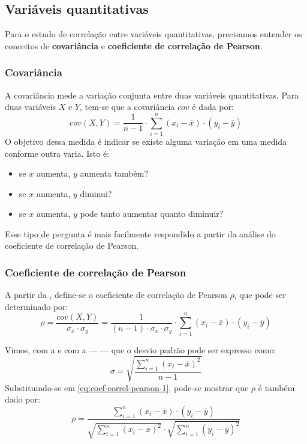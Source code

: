 \subsection{Variáveis quantitativas}%

Para o estudo de correlação entre variáveis quantitativas, precisamos entender
os conceitos de \textbf{covariância} e \textbf{coeficiente de correlação de
Pearson}.

\subsubsection{Covariância}

A covariância mede a variação conjunta entre duas variáveis quantitativas. Para
duas variáveis $X$ e $Y$, tem-se que a covariância $cov$ é dada por:
\begin{equation}
    cov(X,Y) = \frac{1}{n-1} \cdot \sum_{i=1}^{n} (x_i - \overline{x}) \cdot (y_i - \overline{y})
    \label{eq:covariancia}
\end{equation}
O objetivo dessa medida é indicar se existe alguma variação em uma medida
conforme outra varia. Isto é:
\begin{itemize}
    \item se $x$ aumenta, $y$ aumenta também?
    \item se $x$ aumenta, $y$ diminui?
    \item se $x$ aumenta, $y$ pode tanto aumentar quanto diminuir?
\end{itemize}
Esse tipo de pergunta é mais facilmente respondido a partir da análise do
coeficiente de correlação de Pearson.

\subsubsection{Coeficiente de correlação de Pearson}

A partir da , define-se o coeficiente de correlação de
Pearson $\rho$, que pode ser determinado por:
\begin{equation}
    \rho = \frac{cov(X,Y)}{\sigma_x \cdot \sigma_y} =
        \frac{1}{(n-1) \cdot \sigma_x \cdot \sigma_y} \cdot
        \sum_{i=1}^{n} (x_i - \overline{x}) \cdot (y_i - \overline{y})
    \label{eq:coef-correl-pearson-1}
\end{equation}

Vimos, com a  e com a  ---
 ---
que o desvio padrão pode ser expresso como:
\[
    \sigma = \sqrt{\frac{\sum_{i=1}^{n} (x_i - \overline{x})^2}{n-1}}
\]
Substituindo-se em \ref{eq:coef-correl-pearson-1}, pode-se mostrar que $\rho$ é
também dado por:
\begin{equation}
    \rho = \frac{\sum_{i=1}^{n} (x_i - \overline{x}) \cdot (y_i - \overline{y})}
        {
            \sqrt{\sum_{i=1}^{n} (x_i - \overline{x})^2} \cdot
            \sqrt{\sum_{i=1}^{n} (y_i - \overline{y})^2}
        }
\end{equation}

